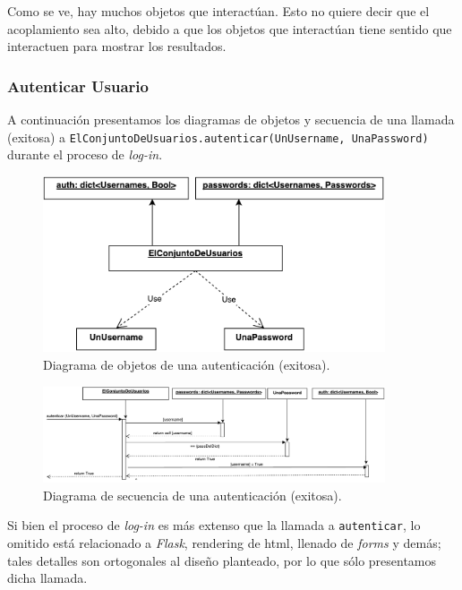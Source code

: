 Como se ve, hay muchos objetos que interactúan. Esto no quiere decir que el acoplamiento sea alto, debido a que los objetos que interactúan tiene sentido que interactuen para mostrar los resultados.

\subsubsection{Autenticar Usuario}

\par A continuación presentamos los diagramas de objetos y secuencia de una llamada (exitosa) a 
\texttt{ElConjuntoDeUsuarios.autenticar(UnUsername, UnaPassword)} durante el proceso de \textit{log-in}.

\begin{figure}[ht]
    \centering
    \includegraphics[width=0.9\textwidth]{diagramas/ObjetosLogIn.pdf}
    \caption{Diagrama de objetos de una autenticación (exitosa).}\label{ObjLogIn}
\end{figure}

\begin{figure}[ht]
    \centering
    \includegraphics[width=0.9\textwidth]{diagramas/SecuenciaLogIn.pdf}
    \caption{Diagrama de secuencia de una autenticación (exitosa).}\label{SecLogIn}
\end{figure}

\par Si bien el proceso de \textit{log-in} es más extenso que la llamada a \texttt{autenticar}, lo omitido está relacionado a \textit{Flask}, rendering de html, llenado de \textit{forms} y demás; tales detalles son ortogonales al diseño planteado, por lo que sólo presentamos dicha llamada.

